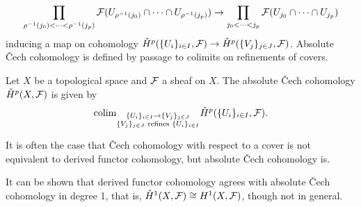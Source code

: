 $$\prod_{\rho^{-1}(j_{0})<\dots<\rho^{-1}(j_{p})}\mathcal{F}(U_{\rho^{-1}(j_{0})}\cap\dots\cap U_{\rho^{-1}(j_{p})})\to\prod_{j_{0}<\dots<j_{p}}\mathcal{F}(U_{j_{0}}\cap\dots\cap U_{j_{p}})$$
inducing a map on cohomology $\check{H}^{p}(\{U_{i}\}_{i\in I},\mathcal{F})\to\check{H}^{p}(\{V_{j}\}_{j\in J},\mathcal{F})$. Absolute \v{C}ech cohomology is defined by passage to colimits on refinements of covers. 
\begin{definition}\label{def: absolute Cech cohomology}
    Let $X$ be a topological space and $\mathcal{F}$ a sheaf on $X$. The absolute \v{C}ech cohomology $\check{H}^{p}(X,\mathcal{F})$ is given by 
    $$\mathrm{colim}_{\substack{\{U_{i}\}_{i\in I}\to\{V_{j}\}_{j\in J} \\ \{V_{j}\}_{j\in J} \text{ refines } \{U_{i}\}_{i\in I}}}\check{H}^{p}(\{U_{i}\}_{i\in I},\mathcal{F}).$$
\end{definition}
\begin{remark}
    It is often the case that \v{C}ech cohomology with respect to a cover is not equivalent to derived functor cohomology, but absolute \v{C}ech cohomology is.
\end{remark}
\begin{remark}
    It can be shown that derived functor cohomology agrees with absolute \v{C}ech cohomology in degree 1, that is, $\check{H}^{1}(X,\mathcal{F})\cong H^{1}(X,\mathcal{F})$, though not in general. 
\end{remark}

